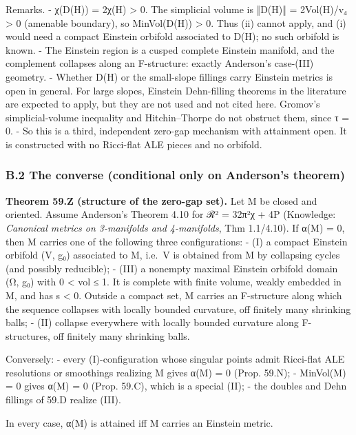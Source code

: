 \documentclass[
  10pt,
]{report}
\begin{document}
Remarks. - χ(D(H)) = 2χ(H) \textgreater{} 0. The simplicial volume is
‖D(H)‖ = 2Vol(H)/v₄ \textgreater{} 0 (amenable boundary), so
MinVol(D(H)) \textgreater{} 0. Thus (ii) cannot apply, and (i) would
need a compact Einstein orbifold associated to D(H); no such orbifold is
known. - The Einstein region is a cusped complete Einstein manifold, and
the complement collapses along an F-structure: exactly Anderson's
case-(III) geometry. - Whether D(H) or the small-slope fillings carry
Einstein metrics is open in general. For large slopes, Einstein
Dehn-filling theorems in the literature are expected to apply, but they
are not used and not cited here. Gromov's simplicial-volume inequality
and Hitchin--Thorpe do not obstruct them, since τ = 0. - So this is a
third, independent zero-gap mechanism with attainment open. It is
constructed with no Ricci-flat ALE pieces and no orbifold.

\hypertarget{b.2-the-converse-conditional-only-on-andersons-theorem}{%
\subsubsection{B.2 The converse (conditional only on Anderson's
theorem)}\label{b.2-the-converse-conditional-only-on-andersons-theorem}}

\textbf{Theorem 59.Z (structure of the zero-gap set).} Let M be closed
and oriented. Assume Anderson's Theorem 4.10 for ℛ² = 32π²χ + 4P
(Knowledge: \emph{Canonical metrics on 3-manifolds and 4-manifolds}, Thm
1.1/4.10). If α(M) = 0, then M carries one of the following three
configurations: - (I) a compact Einstein orbifold (V, g₀) associated to
M, i.e.~V is obtained from M by collapsing cycles (and possibly
reducible); - (III) a nonempty maximal Einstein orbifold domain (Ω, g₀)
with 0 \textless{} vol ≤ 1. It is complete with finite volume, weakly
embedded in M, and has s \textless{} 0. Outside a compact set, M carries
an F-structure along which the sequence collapses with locally bounded
curvature, off finitely many shrinking balls; - (II) collapse everywhere
with locally bounded curvature along F-structures, off finitely many
shrinking balls.

Conversely: - every (I)-configuration whose singular points admit
Ricci-flat ALE resolutions or smoothings realizing M gives α(M) = 0
(Prop. 59.N); - MinVol(M) = 0 gives α(M) = 0 (Prop. 59.C), which is a
special (II); - the doubles and Dehn fillings of 59.D realize (III).

In every case, α(M) is attained iff M carries an Einstein metric.
\end{document}
